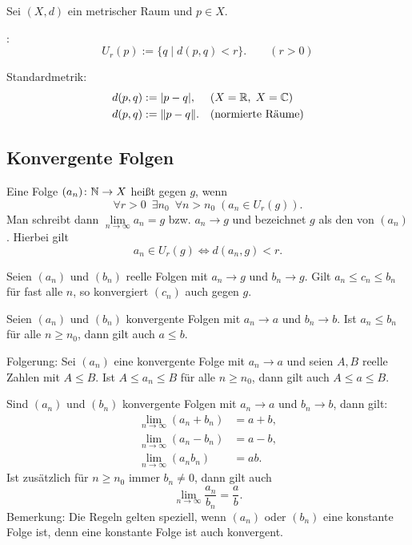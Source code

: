 Sei $(X,d)$ ein metrischer Raum und $p\in X$.

\begin{definition}\mbox{}\newline
{}:
\begin{equation}
U_r(p) := \{q\mid d(p,q)<r\}.\qquad (r>0)
\end{equation}
\end{definition}
Standardmetrik:
\begin{align}
d(p,q) &:= |p-q|,\quad\; (\text{$X=\mathbb R$,\;\,$X=\mathbb C$})\\
d(p,q) &:=\|p-q\|.\quad (\text{normierte Räume})
\end{align}

\subsection{Konvergente Folgen}
\begin{definition}\mbox{}\newline
Eine Folge $(a_n)\colon \mathbb N\to X$ heißt  gegen $g$,
wenn%
\begin{equation}\label{eq:konvergent}
\forall r{>}0\enspace\exists n_0\enspace\forall n{>}n_0\;
(a_n\in U_r(g)).
\end{equation}
Man schreibt dann $\lim\limits_{n\to\infty} a_n=g$ bzw. $a_n\to g$
und bezeichnet $g$ als den 
von $(a_n)$.
Hierbei gilt
\begin{equation}
a_n\in U_r(g)\iff d(a_n,g)<r.
\end{equation}
\end{definition}
 Seien $(a_n)$ und $(b_n)$ reelle Folgen
mit $a_n\to g$ und $b_n\to g$. Gilt $a_n\le c_n\le b_n$ für fast alle
$n$, so konvergiert $(c_n)$ auch gegen $g$.

\minisection{}
Seien $(a_n)$ und $(b_n)$ konvergente Folgen mit $a_n\to a$ und
$b_n\to b$. Ist $a_n\le b_n$ für alle $n\ge n_0$, dann gilt auch
$a\le b$.

Folgerung: Sei $(a_n)$ eine konvergente Folge mit $a_n\to a$ und
seien $A,B$ reelle Zahlen mit $A\le B$. Ist $A\le a_n\le B$ für alle
$n\ge n_0$, dann gilt auch $A\le a\le B$.

\minisection
{} Sind $(a_n)$ und $(b_n)$ konvergente
Folgen mit $a_n\to a$ und $b_n\to b$, dann gilt:
\begin{align}
\lim_{n\to\infty} (a_n+b_n) &= a+b,\\
\lim_{n\to\infty} (a_n-b_n) &= a-b,\\
\lim_{n\to\infty} (a_n b_n) &= ab.
\end{align}
Ist zusätzlich für $n\ge n_0$ immer $b_n\ne 0$, dann gilt auch
\begin{equation}
\lim_{n\to\infty} \frac{a_n}{b_n} = \frac{a}{b}.
\end{equation}
Bemerkung: Die Regeln gelten speziell, wenn $(a_n)$ oder $(b_n)$
eine konstante Folge ist, denn eine konstante Folge ist auch
konvergent.

